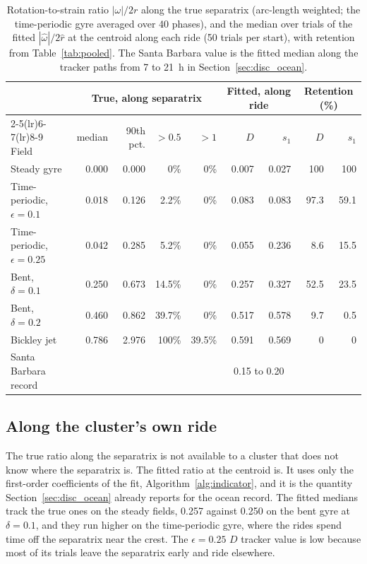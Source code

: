 \documentclass[11pt]{article}
\newcommand{\Dtr}{$D$ tracker}
\begin{document}
\begin{table}[t]
\centering
\caption{Rotation-to-strain ratio $|\omega|/2r$ along the true separatrix
(arc-length weighted; the time-periodic gyre averaged over 40 phases), and
the median over trials of the fitted $|\hat\omega|/2\hat r$ at the
centroid along each ride (50 trials per start), with retention from
Table~\ref{tab:pooled}. The Santa Barbara value is the fitted median along
the tracker paths from 7 to 21~h in Section~\ref{sec:disc_ocean}.}
\label{tab:ratio}
\small
\setlength{\tabcolsep}{4pt}
\begin{tabular}{lrrrr rr rr}
\toprule
 & \multicolumn{4}{c}{True, along separatrix} & \multicolumn{2}{c}{Fitted, along ride} & \multicolumn{2}{c}{Retention (\%)} \\
\cmidrule(lr){2-5}\cmidrule(lr){6-7}\cmidrule(lr){8-9}
Field & median & 90th pct. & $>0.5$ & $>1$ & $D$ & $s_1$ & $D$ & $s_1$ \\
\midrule
Steady gyre                & 0.000 & 0.000 & 0\%    & 0\%    & 0.007 & 0.027 & 100  & 100 \\
Time-periodic, $\epsilon=0.1$  & 0.018 & 0.126 & 2.2\%  & 0\% & 0.083 & 0.083 & 97.3 & 59.1 \\
Time-periodic, $\epsilon=0.25$ & 0.042 & 0.285 & 5.2\%  & 0\% & 0.055 & 0.236 & 8.6  & 15.5 \\
Bent, $\delta=0.1$         & 0.250 & 0.673 & 14.5\% & 0\%    & 0.257 & 0.327 & 52.5 & 23.5 \\
Bent, $\delta=0.2$         & 0.460 & 0.862 & 39.7\% & 0\%    & 0.517 & 0.578 & 9.7  & 0.5 \\
Bickley jet                & 0.786 & 2.976 & 100\%  & 39.5\% & 0.591 & 0.569 & 0    & 0 \\
\midrule
Santa Barbara record       & & & & & \multicolumn{2}{c}{0.15 to 0.20} & & \\
\bottomrule
\end{tabular}
\end{table}

\subsection{Along the cluster's own ride}

The true ratio along the separatrix is not available to a cluster that
does not know where the separatrix is. The fitted ratio at the centroid
is. It uses only the first-order coefficients of the fit,
Algorithm~\ref{alg:indicator}, and it is the quantity
Section~\ref{sec:disc_ocean} already reports for the ocean record. The fitted medians track the true ones on
the steady fields, 0.257 against 0.250 on the bent gyre at $\delta = 0.1$,
and they run higher on the time-periodic gyre, where the rides spend time
off the separatrix near the crest. The $\epsilon = 0.25$ \Dtr{} value is
low because most of its trials leave the separatrix early and ride
elsewhere.
\end{document}
